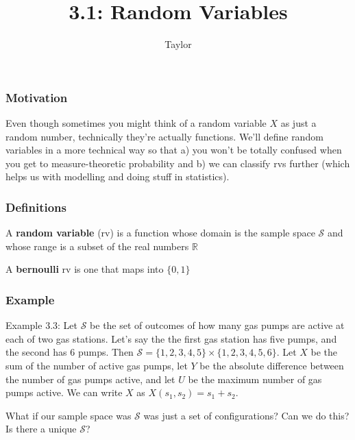 \documentclass{beamer}
\title["3.1"]{3.1: Random Variables}
\author{Taylor}
\institute[UVA] 
{
University of Virginia \\
\medskip
\textit{} 
}
\date{}
\begin{document}

\begin{frame}
\titlepage 
\end{frame}

\begin{frame}
\frametitle{Motivation}

Even though sometimes you might think of a random variable $X$ as just a random number, technically they're actually functions. We'll define random variables in a more technical way so that a) you won't be totally confused when you get to measure-theoretic probability and b) we can classify rvs further (which helps us with modelling and doing stuff in statistics). 


\end{frame}


\begin{frame}
\frametitle{Definitions}

A \textbf{random variable} (rv) is a function whose domain is the sample space $\mathcal{S}$ and whose range is a subset of the real numbers $\mathbb{R}$
\newline

A \textbf{bernoulli} rv is one that maps into $\{0,1\}$

\end{frame}

\begin{frame}
\frametitle{Example}

Example 3.3: Let $\mathcal{S}$ be the set of outcomes of how many gas pumps are active at each of two gas stations. Let's say the the first gas station has five pumps, and the second has 6 pumps. Then $\mathcal{S} = \{1,2,3,4,5\} \times \{1,2,3,4,5,6\}$. Let $X$ be the sum of the number of active gas pumps, let $Y$ be the absolute difference between the number of gas pumps active, and let $U$ be the maximum number of gas pumps active. We can write $X$ as $X(s_1, s_2) = s_1+s_2$.
\newline

What if our sample space was $\mathcal{S}$ was just a set of configurations? Can we do this? Is there a unique $\mathcal{S}$?

\end{frame}
\end{document}
